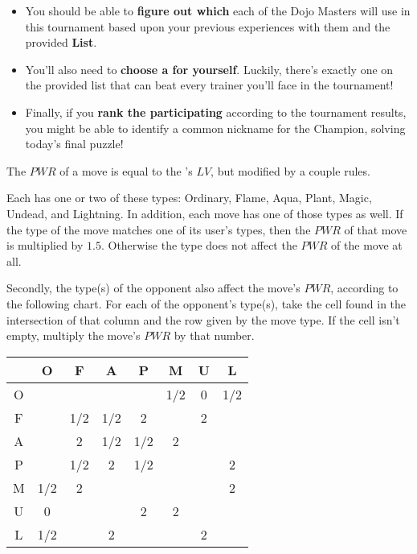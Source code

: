 \begin{itemize}
  \item You should be able to \textbf{figure out which \mappMobimon{}} each of
        the Dojo Masters will use in this tournament
        based upon your previous experiences with them and the provided
        \textbf{\mappMobimon{} List}.
  \item You'll also need to \textbf{choose a \mappMobimon{} for yourself}.
        Luckily, there's exactly one \mappMobimon{} on the provided list that
        can beat every trainer you'll face in the tournament!
  \item Finally, if you \textbf{rank the participating \mappMobimon{}} according
        to the tournament results, you might be able to identify a common
        nickname for the \mappMobimon{} Champion, solving today's final
        puzzle!
\end{itemize}



The \(PWR\) of a \mappMobimon{} move is equal to the
\mappMobimon{}'s \(LV\), but modified by a couple rules.

Each \mappMobimon{} has one or two of these types: Ordinary, Flame, Aqua, Plant,
Magic, Undead, and Lightning. In addition, each \mappMobimon{} move has one
of those types as well. If the type of the move matches one of its user's
types, then the \(PWR\) of that move is multiplied by \(1.5\). Otherwise
the \mappMobimon{} type does not affect the \(PWR\) of the move at all.

Secondly, the type(s) of the opponent \mappMobimon{} also affect the move's
\(PWR\), according to the following chart.
For each of the opponent's type(s), take the cell found in the
intersection of that column and the row given by the move type. If the cell
isn't empty, multiply the move's \(PWR\) by that number.

\begin{center}
\begin{tabular}{c||c|c|c|c|c|c|c|}
     &  O  &  F  &  A  &  P  &  M  &  U  &  L  \\\hline\hline
  O  &     &     &     &     & 1/2 &  0  & 1/2 \\\hline
  F  &     & 1/2 & 1/2 &  2  &     &  2  &     \\\hline
  A  &     &  2  & 1/2 & 1/2 &  2  &     &     \\\hline
  P  &     & 1/2 &  2  & 1/2 &     &     &  2  \\\hline
  M  & 1/2 &  2  &     &     &     &     &  2  \\\hline
  U  &  0  &     &     &  2  &  2  &     &     \\\hline
  L  & 1/2 &     &  2  &     &     &  2  &     \\\hline
\end{tabular}
\end{center}


